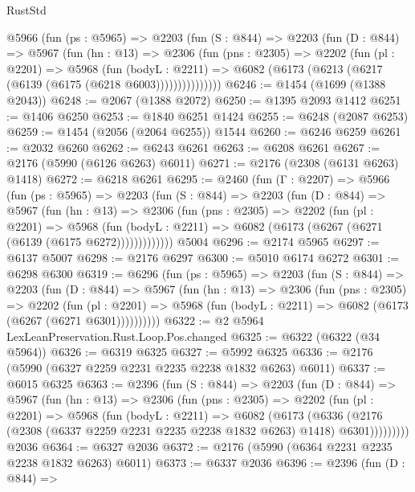 \begin{lexlean}{RustStd}
\begin{coremodule}
{\begin{coremodule}
{{{{{{{{{{      @5966
        (fun (ps : @5965) =>
        @2203
          (fun (S : @844) =>
          @2203
            (fun (D : @844) =>
            @5967
              (fun (hn : @13) =>
              @2306
                (fun (pns : @2305) =>
                @2202
                  (fun (pl : @2201) =>
                  @5968
                    (fun (bodyL : @2211) =>
                    @6082 (@6173 (@6213 (@6217 (@6139 (@6175 (@6218 @6003)))))))))))))))
@6246 := @1454 (@1699 (@1388 @2043))
@6248 := @2067 (@1388 @2072)
@6250 := @1395 @2093 @1412
@6251 := @1406 @6250
@6253 := @1840 @6251 @1424
@6255 := @6248 (@2087 @6253)
@6259 := @1454 (@2056 (@2064 @6255)) @1544
@6260 := @6246 @6259
@6261 := @2032 @6260
@6262 := @6243 @6261
@6263 := @6208 @6261
@6267 := @2176 (@5990 (@6126 @6263) @6011)
@6271 := @2176 (@2308 (@6131 @6263) @1418)
@6272 := @6218 @6261
@6295 := @2460
    (fun (Γ : @2207) =>
    @5966
      (fun (ps : @5965) =>
      @2203
        (fun (S : @844) =>
        @2203
          (fun (D : @844) =>
          @5967
            (fun (hn : @13) =>
            @2306
              (fun (pns : @2305) =>
              @2202
                (fun (pl : @2201) =>
                @5968
                  (fun (bodyL : @2211) =>
                  @6082 (@6173 (@6267 (@6271 (@6139 (@6175 @6272)))))))))))))
    @5004
@6296 := @2174 @5965
@6297 := @6137 @5007
@6298 := @2176 @6297
@6300 := @5010 @6174 @6272
@6301 := @6298 @6300
@6319 := @6296
    (fun (ps : @5965) =>
    @2203
      (fun (S : @844) =>
      @2203
        (fun (D : @844) =>
        @5967
          (fun (hn : @13) =>
          @2306
            (fun (pns : @2305) =>
            @2202
              (fun (pl : @2201) =>
              @5968 (fun (bodyL : @2211) => @6082 (@6173 (@6267 (@6271 @6301))))))))))
@6322 := @2 @5964 LexLeanPreservation.Rust.Loop.Pos.changed
@6325 := @6322 (@6322 (@34 @5964))
@6326 := @6319 @6325
@6327 := @5992 @6325
@6336 := @2176 (@5990 (@6327 @2259 @2231 @2235 @2238 @1832 @6263) @6011)
@6337 := @6015 @6325
@6363 := @2396
    (fun (S : @844) =>
    @2203
      (fun (D : @844) =>
      @5967
        (fun (hn : @13) =>
        @2306
          (fun (pns : @2305) =>
          @2202
            (fun (pl : @2201) =>
            @5968
              (fun (bodyL : @2211) =>
              @6082
                (@6173
                  (@6336
                    (@2176 (@2308 (@6337 @2259 @2231 @2235 @2238 @1832 @6263) @1418) @6301)))))))))
    @2036
@6364 := @6327 @2036
@6372 := @2176 (@5990 (@6364 @2231 @2235 @2238 @1832 @6263) @6011)
@6373 := @6337 @2036
@6396 := @2396
    (fun (D : @844) =>
}}}}}}}}}}
\end{coremodule}}
\end{coremodule}
\end{lexlean}
